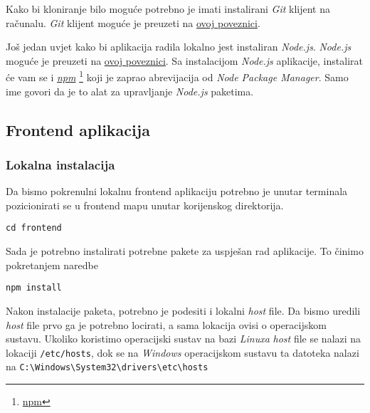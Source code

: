 		    Kako bi kloniranje bilo moguće potrebno je imati instalirani \textit{Git} klijent na računalu. \textit{Git} klijent moguće je preuzeti na \underline{\href{https://git-scm.com/downloads}{ovoj poveznici}}.
		    
		    Još jedan uvjet kako bi aplikacija radila lokalno jest instaliran \textit{Node.js}. \textit{Node.js} moguće je preuzeti na \underline{\href{https://nodejs.org/en/download/}{ovoj poveznici}}. Sa instalacijom \textit{Node.js} aplikacije, instalirat će vam se i \textit{\underline{npm}} \footnote{\href{https://www.npmjs.com/}{npm}} koji je zaprao abrevijacija od \textit{Node Package Manager}. Samo ime govori da je to alat za upravljanje \textit{Node.js} paketima.

		        
				\pagebreak
		

				\subsection{Frontend aplikacija}
	        
						\subsubsection*{Lokalna instalacija}
	        
	          		Da bismo pokrenulni lokalnu frontend aplikaciju potrebno je unutar terminala pozicionirati se u frontend mapu unutar korijenskog direktorija. 
	            
								\begin{center}
										\texttt{cd frontend}
								\end{center}
								
								Sada je potrebno instalirati potrebne pakete za uspješan rad aplikacije. To činimo pokretanjem naredbe
								
								\begin{center}
										\texttt{npm install}
								\end{center}
								
								Nakon instalacije paketa, potrebno je podesiti i lokalni \textit{host} file. Da bismo uredili \textit{host} file prvo ga je potrebno locirati, a sama lokacija ovisi o operacijskom sustavu. Ukoliko koristimo operacijski sustav na bazi \textit{Linuxa} \textit{host} file se nalazi na lokaciji \texttt{/etc/hosts}, dok se na \textit{Windows} operacijskom sustavu ta datoteka nalazi na \verb$C:\Windows\System32\drivers\etc\hosts$
								
